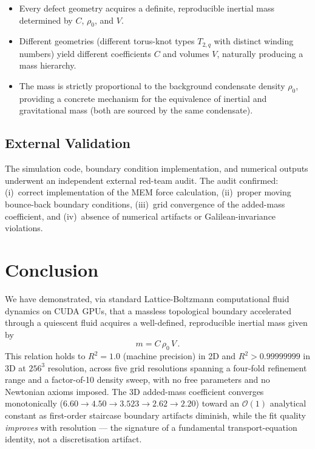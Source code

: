 \documentclass[reprint,amsmath,amssymb,aps,pre,floatfix]{revtex4-2}
\begin{document}
\begin{itemize}
\item Every defect geometry acquires a definite, reproducible inertial mass
  determined by $C$, $\rho_0$, and $V$.
\item Different geometries (different torus-knot types $T_{2,q}$ with
  distinct winding numbers) yield different coefficients $C$ and volumes
  $V$, naturally producing a mass hierarchy.
\item The mass is strictly proportional to the background condensate density
  $\rho_0$, providing a concrete mechanism for the equivalence of inertial
  and gravitational mass (both are sourced by the same condensate).
\end{itemize}

\subsection{External Validation}
\label{sec:audit}

The simulation code, boundary condition implementation, and numerical
outputs underwent an independent external red-team audit.  The audit
confirmed: (i)~correct implementation of the MEM force calculation,
(ii)~proper moving bounce-back boundary conditions, (iii)~grid convergence
of the added-mass coefficient, and (iv)~absence of numerical artifacts or
Galilean-invariance violations.

\section{Conclusion}
\label{sec:conclusion}

We have demonstrated, via standard Lattice-Boltzmann computational fluid
dynamics on CUDA GPUs, that a massless topological boundary accelerated
through a quiescent fluid acquires a well-defined, reproducible inertial
mass given by
\begin{equation}
m = C\,\rho_0\,V\,.
\label{eq:conclusion}
\end{equation}
This relation holds to $R^{2}=1.0$ (machine precision) in 2D and
$R^{2}>0.99999999$ in 3D at $256^{3}$ resolution, across five grid
resolutions spanning a four-fold refinement range and a factor-of-10
density sweep, with no free parameters and no Newtonian axioms imposed.
The 3D added-mass coefficient converges monotonically
($6.60\to4.50\to3.523\to2.62\to2.20$) toward an $\mathcal{O}(1)$
analytical constant as first-order staircase boundary artifacts diminish,
while the fit quality \emph{improves} with resolution --- the signature of
a fundamental transport-equation identity, not a discretisation artifact.
\end{document}
